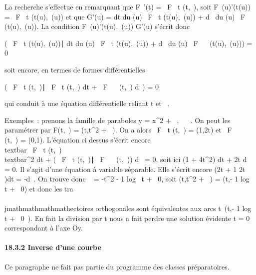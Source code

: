 La recherche s'effectue en remarquant que F\lambda~'(t) = \partial~F
\over \partial~t (t,\lambda~), soit F\lambda~(u)'(t(u)) = \partial~F
\over \partial~t (t(u),\lambda~(u)) et que G'(u) = dt
\over du (u) \partial~F \over \partial~t (t(u),\lambda~(u))
+ d\lambda~ \over du (u) \partial~F \over \partial~\lambda~
(t(u),\lambda~(u)). La condition F\lambda~(u)'(t(u),\lambda~(u)) \bot G'(u) s'écrit
donc

\left ( \partial~F \over \partial~t
(t(u),\lambda~(u))∣ dt \over du
(u) \partial~F \over \partial~t (t(u),\lambda~(u)) + d\lambda~
\over du (u) \partial~F \over \partial~\lambda~
(t(u),\lambda~(u))\right ) = 0

soit encore, en termes de formes différentielles

\left ( \partial~F \over \partial~t
(t,\lambda~)∣ \partial~F \over \partial~t (t,\lambda~)
dt + \partial~F \over \partial~\lambda~ (t,\lambda~) d\lambda~\right ) = 0

qui conduit à une équation différentielle reliant t et \lambda~.

Exemples~: prenons la famille de paraboles y = x^2 + \lambda~, \lambda~ \in
{}~. On peut les paramétrer par F(t,\lambda~) = (t,t^2 + \lambda~). On a
alors  \partial~F \over \partial~t (t,\lambda~) = (1,2t) et  \partial~F
\over \partial~\lambda~ (t,\lambda~) = (0,1). L'équation ci dessus s'écrit
encore \\textbar{} \partial~F \over \partial~t
(t,\lambda~)\\textbar{}^2 dt + \left
( \partial~F \over \partial~t (t,\lambda~)∣ \partial~F
\over \partial~\lambda~ (t,\lambda~)\right ) d\lambda~ = 0, soit ici
(1 + 4t^2) dt + 2t d\lambda~ = 0. Il s'agit d'une équation à
variable séparable. Elle s'écrit encore (2t + 1 \over
2t )dt = -d\lambda~. On trouve donc \lambda~ = -t^2 - 1
  log~
\textbar{}t\textbar{} + \lambda~0, soit (t,t^2 + \lambda~) =
(t,- 1   log~
\textbar{}t\textbar{} + \lambda~0) et donc les tra\\\\jmathmathmathmathectoires
orthogonales sont équivalentes aux arcs
t\mapsto~(t,- 1 
 log t + \lambda~0~). En fait la division
par t nous a fait perdre une solution évidente t = 0 correspondant à
l'axe Oy.

\paragraph{18.3.2 Inverse d'une courbe}

Ce paragraphe ne fait pas partie du programme des classes préparatoires.

